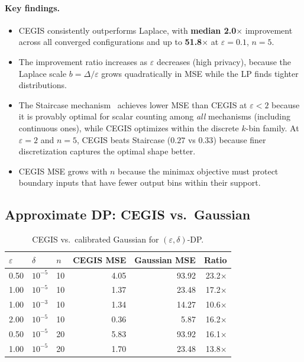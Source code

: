 \documentclass[11pt,a4paper]{article}
\begin{document}
\paragraph{Key findings.}
\begin{itemize}
\item CEGIS consistently outperforms Laplace, with \textbf{median 2.0$\times$}
      improvement across all converged configurations and up to
      \textbf{51.8$\times$} at $\varepsilon = 0.1$, $n = 5$.
\item The improvement ratio increases as $\varepsilon$ decreases (high privacy),
      because the Laplace scale $b = \Delta/\varepsilon$ grows quadratically
      in MSE while the LP finds tighter distributions.
\item The Staircase mechanism~\cite{geng2014optimal} achieves lower MSE than
      CEGIS at $\varepsilon < 2$ because it is provably optimal for scalar
      counting among \emph{all} mechanisms (including continuous ones), while
      CEGIS optimizes within the discrete $k$-bin family.  At $\varepsilon = 2$
      and $n = 5$, CEGIS beats Staircase ($0.27$ vs $0.33$) because finer
      discretization captures the optimal shape better.
\item CEGIS MSE grows with $n$ because the minimax objective must protect
      boundary inputs that have fewer output bins within their support.
\end{itemize}


\subsection{Approximate DP: CEGIS vs.\ Gaussian}

\begin{table}[h]
\centering
\caption{CEGIS vs.\ calibrated Gaussian for $(\varepsilon,\delta)$-DP.}
\label{tab:approx-dp}
\begin{tabular}{@{}lllrrr@{}}
\toprule
$\varepsilon$ & $\delta$ & $n$ & CEGIS MSE & Gaussian MSE & Ratio \\
\midrule
0.50 & $10^{-5}$ & 10 &  4.05 &  93.92 & 23.2$\times$ \\
1.00 & $10^{-5}$ & 10 &  1.37 &  23.48 & 17.2$\times$ \\
1.00 & $10^{-3}$ & 10 &  1.34 &  14.27 & 10.6$\times$ \\
2.00 & $10^{-5}$ & 10 &  0.36 &   5.87 & 16.2$\times$ \\
0.50 & $10^{-5}$ & 20 &  5.83 &  93.92 & 16.1$\times$ \\
1.00 & $10^{-5}$ & 20 &  1.70 &  23.48 & 13.8$\times$ \\
\bottomrule
\end{tabular}
\end{table}
\end{document}
